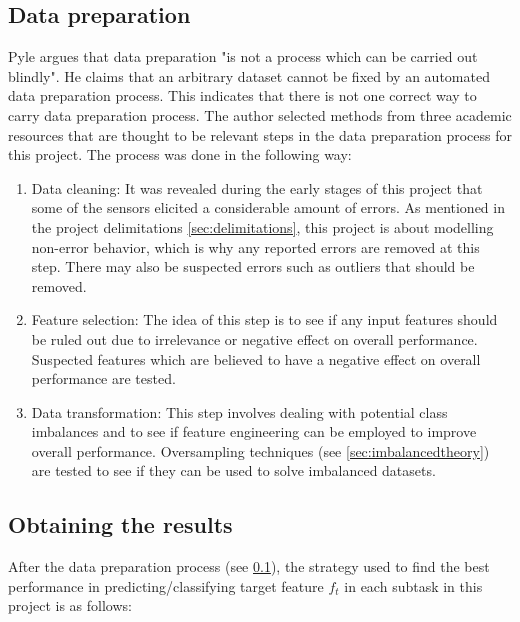 	\subsection{Data preparation} \label{sec:method_dataprep}
		Pyle \cite{BOOK:15} argues that data preparation "is not a process which can be carried out blindly". He claims that an arbitrary dataset cannot be fixed by an automated data preparation process. This indicates that there is not one correct way to carry data preparation process. The author selected methods from three academic resources \cite{BOOK:15, BOOK:16, BOOK:17} that are thought to be relevant steps in the data preparation process for this project. The process was done in the following way:
	\begin{enumerate}
		\item{Data cleaning: } It was revealed during the early stages of this project that some of the sensors elicited a considerable amount of errors. As mentioned in the project delimitations \ref{sec:delimitations}, this project is about modelling non-error behavior, which is why any reported errors are removed at this step. There may also be suspected errors such as outliers that should be removed.
		\item{Feature selection: } The idea of this step is to see if any input features should be ruled out due to irrelevance or negative effect on overall performance. Suspected features which are believed to have a negative effect on overall performance are tested. %
		\item{Data transformation: } This step involves dealing with potential class imbalances and to see if feature engineering can be employed to improve overall performance. Oversampling techniques (see \ref{sec:imbalancedtheory}) are tested to see if they can be used to solve imbalanced datasets.
	\end{enumerate}

	\subsection{Obtaining the results} \label{sec:method_results}
			After the data preparation process (see \ref{sec:method_dataprep}), the strategy used to find the best performance in predicting/classifying target feature $f_t$ in each subtask in this project is as follows:

